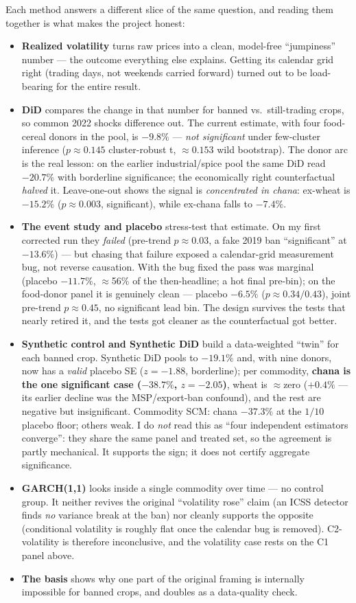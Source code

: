 \documentclass[11pt]{article}
\begin{document}
Each method answers a different slice of the same question, and reading them together is what makes
the project honest:
\begin{itemize}
\item \textbf{Realized volatility} turns raw prices into a clean, model-free ``jumpiness'' number ---
the outcome everything else explains. Getting its calendar grid right (trading days, not weekends
carried forward) turned out to be load-bearing for the entire result.
\item \textbf{DiD} compares the change in that number for banned vs.\ still-trading crops, so common
2022 shocks difference out. The current estimate, with four food-cereal donors in the pool, is
$-9.8\%$ --- \emph{not significant} under few-cluster inference ($p\approx0.145$ cluster-robust t,
$\approx0.153$ wild bootstrap). The donor arc is the real lesson: on the earlier industrial/spice
pool the same DiD read $-20.7\%$ with borderline significance; the economically right counterfactual
\emph{halved} it. Leave-one-out shows the signal is \emph{concentrated in chana}: ex-wheat is
$-15.2\%$ ($p\approx0.003$, significant), while ex-chana falls to $-7.4\%$.
\item \textbf{The event study and placebo} stress-test that estimate. On my first corrected run they
\emph{failed} (pre-trend $p\approx0.03$, a fake 2019 ban ``significant'' at $-13.6\%$) --- but chasing
that failure exposed a calendar-grid measurement bug, not reverse causation. With the bug fixed the
pass was marginal (placebo $-11.7\%$, $\approx$56\% of the then-headline; a hot final pre-bin); on
the food-donor panel it is genuinely clean --- placebo $-6.5\%$ ($p\approx0.34/0.43$), joint
pre-trend $p\approx0.45$, no significant lead bin. The design survives the tests that nearly
retired it, and the tests got cleaner as the counterfactual got better.
\item \textbf{Synthetic control and Synthetic DiD} build a data-weighted ``twin'' for each banned
crop. Synthetic DiD pools to $-19.1\%$ and, with nine donors, now has a \emph{valid} placebo SE
($z=-1.88$, borderline); per commodity, \textbf{chana is the one significant case ($-38.7\%$,
$z=-2.05$)}, wheat is $\approx$zero ($+0.4\%$ --- its earlier decline was the MSP/export-ban
confound), and the rest are negative but insignificant. Commodity SCM: chana $-37.3\%$ at the
$1/10$ placebo floor; others weak. I do \emph{not} read this as ``four independent estimators
converge'': they share the same panel and treated set, so the agreement is partly mechanical. It
supports the sign; it does not certify aggregate significance.
\item \textbf{GARCH(1,1)} looks inside a single commodity over time --- no control group. It neither
revives the original ``volatility rose'' claim (an ICSS detector finds \emph{no} variance break at
the ban) nor cleanly supports the opposite (conditional volatility is roughly flat once the calendar
bug is removed). C2-volatility is therefore inconclusive, and the volatility case rests on the C1
panel above.
\item \textbf{The basis} shows why one part of the original framing is internally impossible for
banned crops, and doubles as a data-quality check.
\end{itemize}
\end{document}
